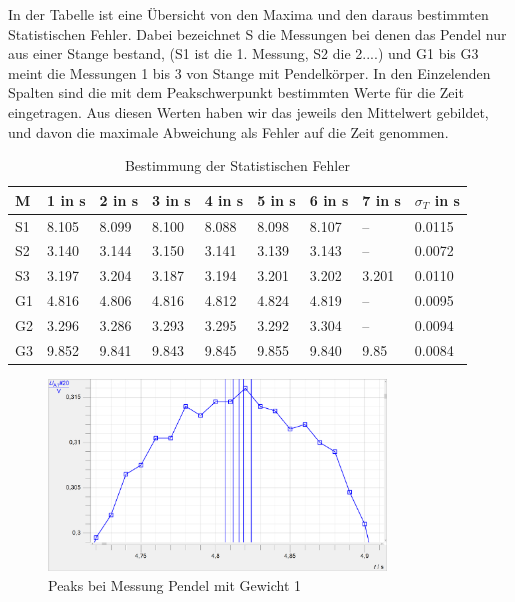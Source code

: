 \documentclass[twoside]{protokoll}
\begin{document}
In der Tabelle ist eine Übersicht von den Maxima und den daraus bestimmten Statistischen Fehler.
Dabei bezeichnet S die Messungen bei denen das Pendel nur aus einer Stange bestand, (S1 ist die 1. Messung, S2 die 2....) und G1 bis G3 meint die Messungen 1 bis 3 von Stange mit Pendelkörper.
In den Einzelenden Spalten sind die mit dem Peakschwerpunkt bestimmten Werte für die Zeit eingetragen.
Aus diesen Werten haben wir das jeweils den Mittelwert gebildet, und davon die maximale Abweichung als Fehler auf die Zeit genommen.

\begin{table}[H]
    \centering
    \begin{tabularx}{1.0\textwidth}{X X X X X X X X X}
       \textbf{M} & \textbf{1 in s}  & \textbf{2 in s} & \textbf{3 in s} & \textbf{4 in s} & \textbf{5 in s} & \textbf{6 in s} & \textbf{7 in s} & \textbf{$\sigma_T$ in s} \\
       \toprule
        S1 & 8.105 & 8.099 & 8.100 & 8.088 & 8.098 & 8.107 &    -- & 0.0115 \\
        S2 & 3.140 & 3.144 & 3.150 & 3.141 & 3.139 & 3.143 &    -- & 0.0072 \\
        S3 & 3.197 & 3.204 & 3.187 & 3.194 & 3.201 & 3.202 & 3.201 & 0.0110 \\
        G1 & 4.816 & 4.806 & 4.816 & 4.812 & 4.824 & 4.819  &    -- & 0.0095 \\
        G2 & 3.296 & 3.286 & 3.293 & 3.295 & 3.292 & 3.304 &    -- & 0.0094 \\
        G3 & 9.852 & 9.841 & 9.843 & 9.845 & 9.855 & 9.840 & 9.85 &0.0084 \\
        \bottomrule
    \end{tabularx}
    \caption{Bestimmung der Statistischen Fehler}
\end{table}

 
 
\begin{figure}[H]
    \centering
    \includegraphics[width=0.8\textwidth]{plots/unsicherheit-bestimmen-gewicht-1.pdf}
    \caption{Peaks bei Messung Pendel mit Gewicht 1}
\end{figure}
\end{document}
